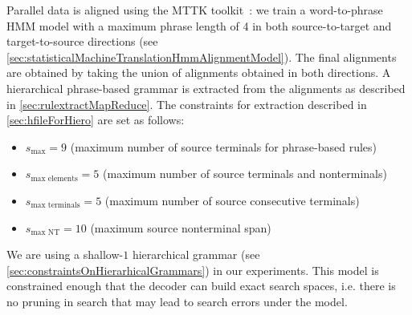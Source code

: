 Parallel data is aligned using the MTTK
toolkit~\citep{deng-and-byrne:2008:ASLP}:
we train a word-to-phrase HMM model with a maximum phrase length of 4 in both
source-to-target and target-to-source
directions (see \autoref{sec:statisticalMachineTranslationHmmAlignmentModel}).
The final alignments are obtained
by taking the union of alignments obtained in both directions.
A hierarchical phrase-based grammar
is extracted from the alignments as described
in \autoref{sec:rulextractMapReduce}. The constraints for extraction
described in \autoref{sec:hfileForHiero} are set as follows:
%
\begin{itemize}
  \item $s_{\text{max}} = 9$ (maximum number of source terminals for phrase-based rules)
  \item $s_{\text{max elements}} = 5$ (maximum number of source terminals and nonterminals)
  \item $s_{\text{max terminals}} = 5$ (maximum number of source consecutive terminals)
  \item $s_{\text{max NT}} = 10$ (maximum source nonterminal span)
\end{itemize}
%
We are using a shallow-$1$ hierarchical
grammar (see \autoref{sec:constraintsOnHierarhicalGrammars}) in our
experiments.
This model is constrained enough that the decoder can build exact search spaces,
i.e. there is no pruning in search that may lead to search errors under the model. %

